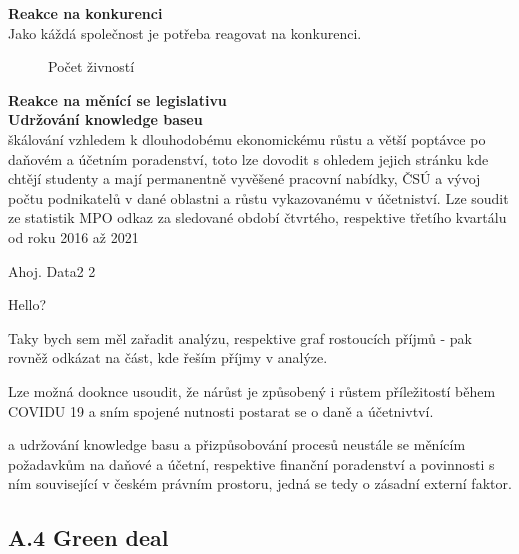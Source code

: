 

\textbf{Reakce na konkurenci}\\

Jako káždá společnost je potřeba reagovat na konkurenci.

\begin{figure}
	\caption{Počet živností}
	\label{fig:pz}
\end{figure}

\textbf{Reakce na měnící se legislativu}\\

\textbf{Udržování knowledge baseu}\\


škálování vzhledem k dlouhodobému ekonomickému růstu a větší poptávce po daňovém a účetním poradenství, toto lze dovodit s ohledem jejich stránku kde chtějí studenty a mají permanentně vyvěšené pracovní nabídky, ČSÚ a vývoj počtu podnikatelů v dané oblastni a růstu vykazovanému v účetniství. Lze soudit ze statistik MPO odkaz za sledované období čtvrtého, respektive třetího kvartálu od roku 2016 až 2021

Ahoj.
Data2 2

Hello?

%

Taky bych sem měl zařadit analýzu, respektive graf rostoucích příjmů - pak rovněž odkázat na část, kde řeším příjmy v analýze.

Lze možná dooknce usoudit, že nárůst je způsobený i růstem příležitostí během COVIDU 19 a sním spojené nutnosti postarat se o daně a účetnivtví.


 a udržování knowledge basu a přizpůsobování procesů neustále se měnícím požadavkům na daňové a účetní, respektive finanční poradenství a povinnosti s ním související v českém právním prostoru, jedná se tedy o zásadní externí faktor.

\subsection*{A.4 Green deal}
\label{sec:Green deal}

